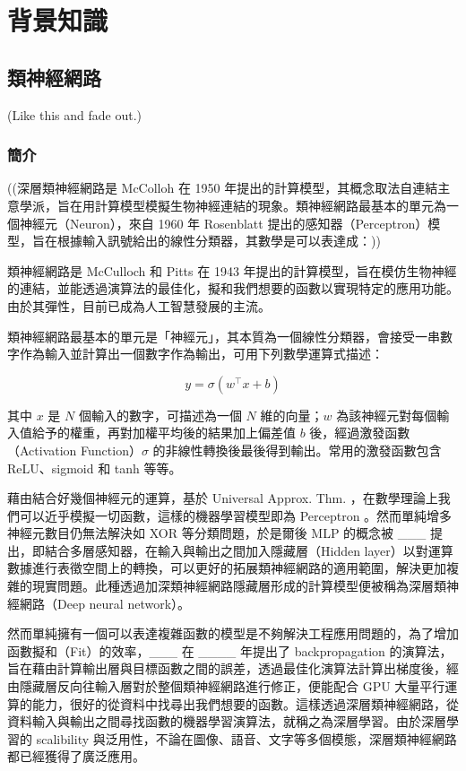 
\chapter{背景知識}

\section{類神經網路}

(Like this \cite{lecun_gradient-based_1998, baevski_wav2vec_2020} and fade out.)

\subsection{簡介}

((深層類神經網路是 McColloh 在 1950 年提出的計算模型，其概念取法自連結主意學派，旨在用計算模型模擬生物神經連結的現象。類神經網路最基本的單元為一個神經元（Neuron），來自 1960 年 Rosenblatt 提出的感知器（Perceptron）模型，旨在根據輸入訊號給出的線性分類器，其數學是可以表達成：))

類神經網路是 McCulloch 和 Pitts \cite{mcculloch_logical_1943} 在 1943 年提出的計算模型，旨在模仿生物神經的連結，並能透過演算法的最佳化，擬和我們想要的函數以實現特定的應用功能。由於其彈性，目前已成為人工智慧發展的主流。

類神經網路最基本的單元是「神經元」，其本質為一個線性分類器，會接受一串數字作為輸入並計算出一個數字作為輸出，可用下列數學運算式描述：

\[ y=\sigma(w^\top x + b) \]

其中 \(x\) 是 \(N\) 個輸入的數字，可描述為一個 \(N\) 維的向量；\(w\) 為該神經元對每個輸入值給予的權重，再對加權平均後的結果加上偏差值 \(b\) 後，經過激發函數（Activation Function）\(\sigma\) 的非線性轉換後最後得到輸出。常用的激發函數包含 ReLU、sigmoid 和 tanh 等等。

藉由結合好幾個神經元的運算，基於 Universal Approx. Thm. ，在數學理論上我們可以近乎模擬一切函數，這樣的機器學習模型即為 Perceptron \cite{rosenblatt_perceptron_1958}。然而單純增多神經元數目仍無法解決如 XOR 等分類問題，於是爾後 MLP 的概念被 \_\_\_ 提出，即結合多層感知器，在輸入與輸出之間加入隱藏層（Hidden layer）以對運算數據進行表徵空間上的轉換，可以更好的拓展類神經網路的適用範圍，解決更加複雜的現實問題。此種透過加深類神經網路隱藏層形成的計算模型便被稱為深層類神經網路（Deep neural network）。

然而單純擁有一個可以表達複雜函數的模型是不夠解決工程應用問題的，為了增加函數擬和（Fit）的效率，\_\_\_ 在 \_\_\_\_ 年提出了 backpropagation 的演算法，旨在藉由計算輸出層與目標函數之間的誤差，透過最佳化演算法計算出梯度後，經由隱藏層反向往輸入層對於整個類神經網路進行修正，便能配合 GPU 大量平行運算的能力，很好的從資料中找尋出我們想要的函數。這樣透過深層類神經網路，從資料輸入與輸出之間尋找函數的機器學習演算法，就稱之為深層學習。由於深層學習的 scalibility 與泛用性，不論在圖像、語音、文字等多個模態，深層類神經網路都已經獲得了廣泛應用。

